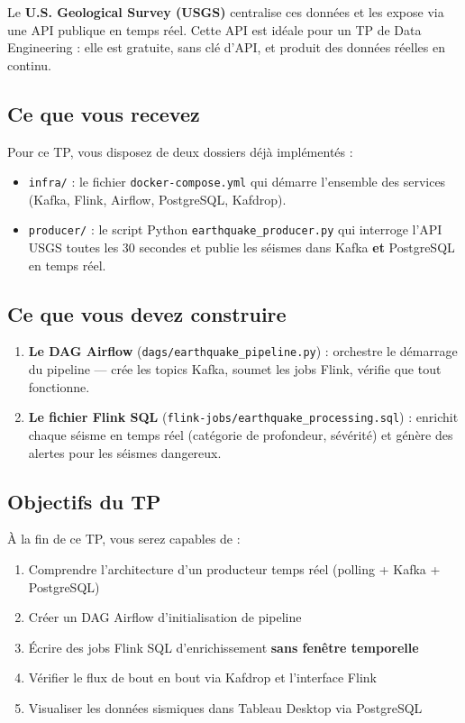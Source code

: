 \documentclass[12pt,a4paper]{article}
\begin{document}
Le \textbf{U.S. Geological Survey (USGS)} centralise ces données et les expose via une
API publique en temps réel. Cette API est idéale pour un TP de Data Engineering :
elle est gratuite, sans clé d'API, et produit des données réelles en continu.

\subsection*{Ce que vous recevez}

Pour ce TP, vous disposez de deux dossiers déjà implémentés :

\begin{itemize}
  \item \texttt{infra/} : le fichier \texttt{docker-compose.yml} qui démarre l'ensemble
        des services (Kafka, Flink, Airflow, PostgreSQL, Kafdrop).
  \item \texttt{producer/} : le script Python \texttt{earthquake\_producer.py} qui
        interroge l'API USGS toutes les 30 secondes et publie les séismes dans Kafka
        \textbf{et} PostgreSQL en temps réel.
\end{itemize}

\subsection*{Ce que vous devez construire}

\begin{enumerate}[label=\textbf{\arabic*.}]
  \item \textbf{Le DAG Airflow} (\texttt{dags/earthquake\_pipeline.py}) :
        orchestre le démarrage du pipeline --- crée les topics Kafka,
        soumet les jobs Flink, vérifie que tout fonctionne.
  \item \textbf{Le fichier Flink SQL} (\texttt{flink-jobs/earthquake\_processing.sql}) :
        enrichit chaque séisme en temps réel (catégorie de profondeur, sévérité)
        et génère des alertes pour les séismes dangereux.
\end{enumerate}

\subsection*{Objectifs du TP}

À la fin de ce TP, vous serez capables de :

\begin{enumerate}[label=\textbf{\arabic*.}]
  \item Comprendre l'architecture d'un producteur temps réel (polling + Kafka + PostgreSQL)
  \item Créer un DAG Airflow d'initialisation de pipeline
  \item Écrire des jobs Flink SQL d'enrichissement \textbf{sans fenêtre temporelle}
  \item Vérifier le flux de bout en bout via Kafdrop et l'interface Flink
  \item Visualiser les données sismiques dans Tableau Desktop via PostgreSQL
\end{enumerate}
\end{document}

